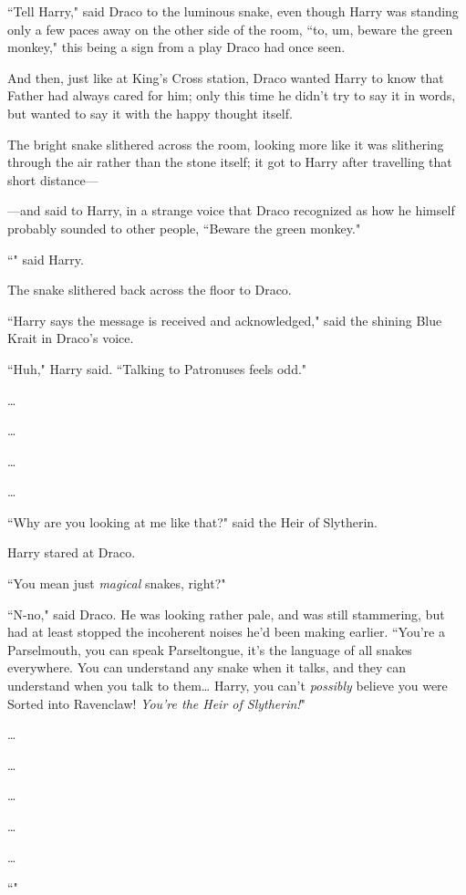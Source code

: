 ``Tell Harry," said Draco to the luminous snake, even though Harry was standing only a few paces away on the other side of the room, ``to, um, beware the green monkey," this being a sign from a play Draco had once seen.

And then, just like at King's Cross station, Draco wanted Harry to know that Father had always cared for him; only this time he didn't try to say it in words, but wanted to say it with the happy thought itself.

The bright snake slithered across the room, looking more like it was slithering through the air rather than the stone itself; it got to Harry after travelling that short distance—

—and said to Harry, in a strange voice that Draco recognized as how he himself probably sounded to other people, ``Beware the green monkey."

``" said Harry.

The snake slithered back across the floor to Draco.

``Harry says the message is received and acknowledged," said the shining Blue Krait in Draco's voice.

``Huh," Harry said. ``Talking to Patronuses feels odd."

{\ldots}

{\ldots}

{\ldots}

{\ldots}

``Why are you looking at me like that?" said the Heir of Slytherin.


Harry stared at Draco.

``You mean just \emph{magical} snakes, right?"

``N-no," said Draco. He was looking rather pale, and was still stammering, but had at least stopped the incoherent noises he'd been making earlier. ``You're a Parselmouth, you can speak Parseltongue, it's the language of all snakes everywhere. You can understand any snake when it talks, and they can understand when you talk to them{\ldots} Harry, you can't \emph{possibly} believe you were Sorted into Ravenclaw! \emph{You're the Heir of Slytherin!}"

{\ldots}

{\ldots}

{\ldots}

{\ldots}

{\ldots}

``"

